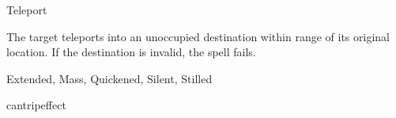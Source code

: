 \begin{spellsection}{Teleport}
\begin{spellcontent}
\begin{spelltargetinginfo}
\end{spelltargetinginfo}
\begin{spelleffects}
\spelleffect
The target teleports into an unoccupied destination within \rngmed range of its original location.
If the destination is invalid, the spell fails.
\end{spelleffects}
\end{spellcontent}
\begin{spellfooter}
 Extended, Mass, Quickened, Silent, Stilled
\end{spellfooter}
\begin{spellsubcontent}
\begin{spellcantrip}
cantripeffect
\end{spellcantrip}
\end{spellsubcontent}
\end{spellsection}
